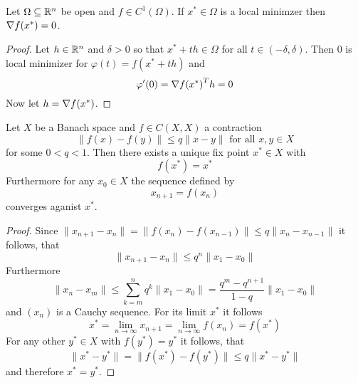 \begin{theorem}\label{thm:fonc}
    Let \( \Omega \subseteq \mathbb{R}^n \) be open and \( f \in C^1(\Omega) \). If \( x^* \in \Omega \) is a local minimzer then
    \( \nabla f(x^*) = 0 \).
\end{theorem}

\begin{proof}
    Let \( h \in \mathbb{R}^n \) and \( \delta > 0 \) so that \( x^* + th \in \Omega \) for all \( t \in (-\delta, \delta) \).
    Then \( 0 \) is local minimizer for \( \varphi(t) = f(x^* + th) \) and
    \[
        \varphi'(0) = {\nabla f(x^*)}^T h = 0
    \]
    Now let \( h = \nabla f(x^*) \).
\end{proof}
\bigskip


\begin{theorem}\label{thm:banach_fix_point}
    Let \( X \) be a Banach space and \( f \in C(X,X) \) a contraction
    \[
        \|f(x) - f(y)\| \le q \|x - y\| \text{ for all } x, y \in X
    \]
    for some \( 0 < q < 1 \). Then there exists a unique fix point \( x^* \in X \) with
    \[
        f(x^*) = x^*
    \]
    Furthermore for any \( x_0 \in X \) the sequence defined by
    \[
        x_{n+1} = f(x_n)
    \]
    converges aganist \( x^* \).
\end{theorem}

\begin{proof}
    Since \( \| x_{n+1} - x_n\| =\| f(x_n) - f(x_{n-1})\| \le q\| x_n - x_{n-1}\| \) it follows, that
    \[
        \| x_{n+1} - x_n\| \le q^n  \|x_1 - x_0\|
    \]
    Furthermore
    \[
        \| x_n - x_m\| \le \sum_{k=m}^n q^k \|x_1 - x_0\| = \frac{q^m - q^{n+1}}{1 - q} \|x_1 - x_0\|
    \]
    and \( (x_n) \) is a Cauchy sequence. For its limit \( x^* \) it follows
    \[
        x^* = \lim_{n\to\infty} x_{n+1} = \lim_{n\to\infty} f(x_n) = f(x^*)
    \]
    For any other \( y^* \in X \) with \( f(y^*) = y^* \) it follows, that
    \[
        \|x^* - y^*\| = \|f(x^*) - f(y^*)\| \le q \|x^* - y^*\|
    \]
    and therefore \( x^* = y^*\).

\end{proof}
\bigskip

